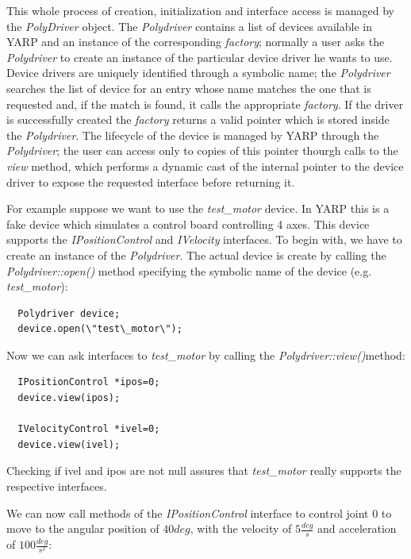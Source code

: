 This whole process of creation, initialization and interface access is managed
by the  \emph{PolyDriver} object. The \emph{Polydriver} contains a list of devices 
available in YARP and an instance of the corresponding \emph{factory}; normally a
user asks the \emph{Polydriver} to create an instance of the particular device driver
he wants to use. Device drivers are uniquely identified through a symbolic name; 
the \emph{Polydriver} searches the list of device for an entry whose name matches the 
one that is requested and, if the match is found, it calls the appropriate 
\emph{factory}. If the driver is successfully created the \emph{factory} returns 
a valid pointer which is stored inside the \emph{Polydriver}. The lifecycle of the 
device is managed by YARP through the \emph{Polydriver}; the user can access only to 
copies of 
this pointer thourgh calls to the \emph{view} method, which performs 
a dynamic cast of the internal pointer to the device driver to expose the requested
interface before returning it.

For example suppose we want to use the \emph{test\_motor} device. In YARP this 
is a fake device which simulates a control board controlling 4 axes. This device 
supports the \emph{IPositionControl} and \emph{IVelocity} interfaces. To begin with, 
we have to create an instance of the \emph{Polydriver}. The actual device is create 
by calling the \emph{Polydriver::open()} method specifying the symbolic name of the 
device (e.g. \emph{test\_motor}):

\begin{verbatim}
  Polydriver device;
  device.open(\"test\_motor\");
\end{verbatim}

Now we can ask interfaces to \emph{test\_motor} by calling the 
\emph{Polydriver::view()}method:

\begin{verbatim}
  IPositionControl *ipos=0;
  device.view(ipos);

  IVelocityControl *ivel=0;
  device.view(ivel);
\end{verbatim}

Checking if ivel and ipos are not null assures that \emph{test\_motor} really supports
the respective interfaces.

We can now call methods of the \emph{IPositionControl} interface to control 
joint $0$ to move to the angular position of $40deg$, with the velocity of $5\frac{deg}{s}$ and acceleration of $100\frac{deg}{s^2}$:

